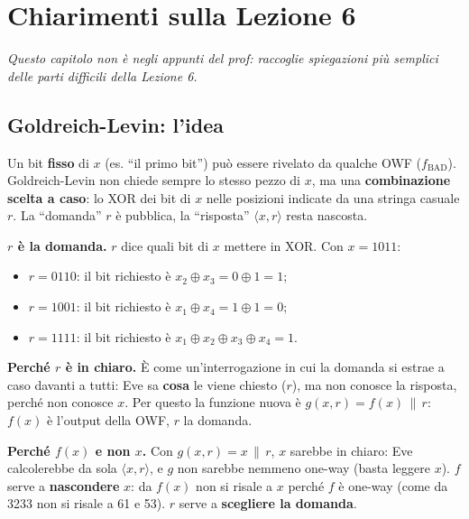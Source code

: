 
\chapter{Chiarimenti sulla Lezione 6}

\textit{Questo capitolo non è negli appunti del prof: raccoglie spiegazioni più semplici delle parti difficili della Lezione 6.}

\section{Goldreich-Levin: l'idea}

\begin{inbreve}
Un bit \textbf{fisso} di \(x\) (es. ``il primo bit'') può essere rivelato da qualche OWF (\(f_{\text{BAD}}\)). Goldreich-Levin non chiede sempre lo stesso pezzo di \(x\), ma una \textbf{combinazione scelta a caso}: lo XOR dei bit di \(x\) nelle posizioni indicate da una stringa casuale \(r\). La ``domanda'' \(r\) è pubblica, la ``risposta'' \(\langle x, r \rangle\) resta nascosta.
\end{inbreve}

\textbf{\(r\) è la domanda.} \(r\) dice quali bit di \(x\) mettere in XOR. Con \(x = 1011\):
\begin{itemize}
  \item \(r = 0110\): il bit richiesto è \(x_2 \oplus x_3 = 0 \oplus 1 = 1\);
  \item \(r = 1001\): il bit richiesto è \(x_1 \oplus x_4 = 1 \oplus 1 = 0\);
  \item \(r = 1111\): il bit richiesto è \(x_1 \oplus x_2 \oplus x_3 \oplus x_4 = 1\).
\end{itemize}

\textbf{Perché \(r\) è in chiaro.} È come un'interrogazione in cui la domanda si estrae a caso davanti a tutti: Eve sa \textbf{cosa} le viene chiesto (\(r\)), ma non conosce la risposta, perché non conosce \(x\). Per questo la funzione nuova è \(g(x, r) = f(x) \,\|\, r\): \(f(x)\) è l'output della OWF, \(r\) la domanda.

\textbf{Perché \(f(x)\) e non \(x\).} Con \(g(x, r) = x \,\|\, r\), \(x\) sarebbe in chiaro: Eve calcolerebbe da sola \(\langle x, r \rangle\), e \(g\) non sarebbe nemmeno one-way (basta leggere \(x\)). \(f\) serve a \textbf{nascondere} \(x\): da \(f(x)\) non si risale a \(x\) perché \(f\) è one-way (come da 3233 non si risale a 61 e 53). \(r\) serve a \textbf{scegliere la domanda}.

